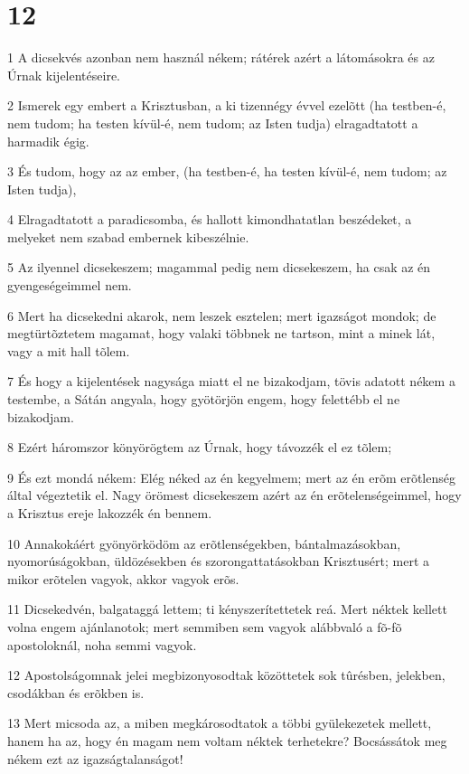 \chapter{12}

\par 1 A dicsekvés azonban nem használ nékem; rátérek azért a látomásokra és az Úrnak kijelentéseire.
\par 2 Ismerek egy embert a Krisztusban, a ki tizennégy évvel ezelõtt (ha testben-é, nem tudom; ha testen kívül-é, nem tudom; az Isten tudja) elragadtatott a harmadik égig.
\par 3 És tudom, hogy az az ember, (ha testben-é, ha testen kívül-é, nem tudom; az Isten tudja),
\par 4 Elragadtatott a paradicsomba, és hallott kimondhatatlan beszédeket, a melyeket nem szabad embernek kibeszélnie.
\par 5 Az ilyennel dicsekeszem; magammal pedig nem dicsekeszem, ha csak az én gyengeségeimmel nem.
\par 6 Mert ha dicsekedni akarok, nem leszek esztelen; mert igazságot mondok; de megtürtõztetem magamat, hogy valaki többnek ne tartson, mint a minek lát, vagy a mit hall tõlem.
\par 7 És hogy a kijelentések nagysága miatt el ne bizakodjam, tövis adatott nékem a testembe, a Sátán angyala, hogy gyötörjön engem, hogy felettébb el ne bizakodjam.
\par 8 Ezért háromszor könyörögtem az Úrnak, hogy távozzék el ez tõlem;
\par 9 És ezt mondá nékem: Elég néked az én kegyelmem; mert az én erõm erõtlenség által végeztetik el. Nagy örömest dicsekeszem azért az én erõtelenségeimmel, hogy a Krisztus ereje lakozzék én bennem.
\par 10 Annakokáért gyönyörködöm az erõtlenségekben, bántalmazásokban, nyomorúságokban, üldözésekben és szorongattatásokban Krisztusért; mert a mikor erõtelen vagyok, akkor vagyok  erõs.
\par 11 Dicsekedvén, balgataggá lettem; ti kényszerítettetek reá. Mert néktek kellett volna engem ajánlanotok; mert semmiben sem vagyok alábbvaló a fõ-fõ apostoloknál,  noha semmi vagyok.
\par 12 Apostolságomnak jelei megbizonyosodtak közöttetek sok tûrésben, jelekben, csodákban és erõkben is.
\par 13 Mert micsoda az, a miben megkárosodtatok a többi gyülekezetek mellett, hanem ha az, hogy én magam nem voltam néktek terhetekre? Bocsássátok meg nékem ezt az igazságtalanságot!
